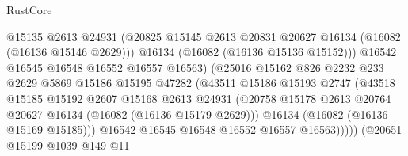 \begin{lexlean}{RustCore}
\begin{coremodule}
                                    @15135
                                    @2613
                                    @24931
                                    (@20825
                                      @15145
                                      @2613
                                      @20831
                                      @20627
                                      @16134
                                      (@16082 (@16136 @15146 @2629)))
                                    @16134
                                    (@16082 (@16136 @15136 @15152)))
                                  @16542
                                  @16545
                                  @16548
                                  @16552
                                  @16557
                                  @16563)
                                (@25016
                                  @15162
                                  @826
                                  @2232
                                  @233
                                  @2629
                                  @5869
                                  @15186
                                  @15195
                                  @47282
                                  (@43511
                                    @15186
                                    @15193
                                    @2747
                                    (@43518
                                      @15185
                                      @15192
                                      @2607
                                      @15168
                                      @2613
                                      @24931
                                      (@20758
                                        @15178
                                        @2613
                                        @20764
                                        @20627
                                        @16134
                                        (@16082 (@16136 @15179 @2629)))
                                      @16134
                                      (@16082 (@16136 @15169 @15185)))
                                    @16542
                                    @16545
                                    @16548
                                    @16552
                                    @16557
                                    @16563)))))
                          (@20651
                            @15199
                            @1039
                            @149
                            @11

\end{coremodule}
\end{lexlean}
